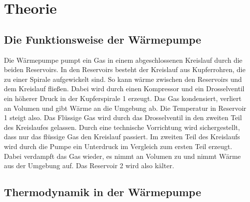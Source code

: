 \section{Theorie}

\subsection{Die Funktionsweise der Wärmepumpe} %
Die Wärmepumpe pumpt ein Gas in einem abgeschlossenen Kreislauf durch die beiden Reservoirs.
In den Reservoirs besteht der Kreislauf aus Kupferrohren, die zu einer Spirale aufgewickelt sind.
So kann wärme zwischen den Reservoirs und dem Kreislauf fließen.
Dabei wird durch einen Kompressor und ein Drosselventil ein höherer Druck in der Kupferspirale 1 erzeugt.
Das Gas kondensiert,  verliert an Volumen und gibt Wärme an die Umgebung ab.
Die Temperatur in Reservoir 1 steigt also. 
Das Flüssige Gas wird durch das Drosselventil in den zweiten Teil des Kreislaufes gelassen.
Durch eine technische Vorrichtung wird sichergestellt, dass nur das flüssige Gas den Kreislauf passiert.
Im zweiten Teil des Kreislaufs wird durch die Pumpe ein Unterdruck im Vergleich zum ersten Teil erzeugt.
Dabei verdampft das Gas wieder, es nimmt an Volumen zu und nimmt Wärme aus der Umgebung auf.
Das Reservoir 2 wird also kälter.

\subsection{Thermodynamik in der Wärmepumpe}

